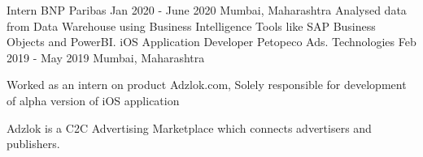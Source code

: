 \begin{cventries}
\cventry
    {Intern} %
    {BNP Paribas} %
    {Jan 2020 - June 2020} %
    {Mumbai, Maharashtra} %
    {
        Analysed data from Data Warehouse using Business Intelligence Tools like SAP Business Objects and PowerBI.
    }
  \vspace{1.0em}
  \cventry
    {iOS Application Developer} %
    {Petopeco Ads. Technologies} %
    {Feb 2019 - May 2019} %
    {Mumbai, Maharashtra} %
    {
      \begin{cvitems} %
        \item Worked as an intern on product Adzlok.com, Solely responsible for development of alpha version of iOS application
        \item Adzlok is a C2C Advertising Marketplace which connects advertisers and publishers.
      \end{cvitems}
    }
\end{cventries}
